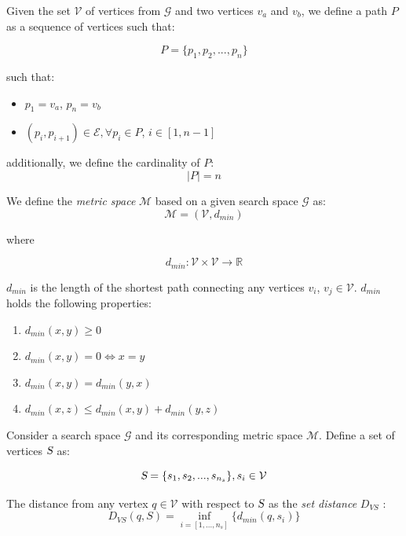 \documentclass[graybox]{svmult}
\newcommand{\Path}{\ensuremath{P} }
\newcommand{\Graph}{\ensuremath{\mathcal G} }
\newcommand{\VertexSet}{\ensuremath{\mathcal V} }
\newcommand{\EdgeSet}{\ensuremath{\mathcal E} }
\newcommand{\MetricSpace}{\ensuremath{\mathcal M} }
\newcommand{\DistanceMetric}{\ensuremath{d_{min}} }
\newcommand{\Set}{\ensuremath{\textsl S} }
\newcommand{\VertexSetDistance}{\ensuremath{D_{VS}} }
\begin{document}
\begin{definition}[Path]
Given the set \VertexSet of vertices from \Graph and two vertices $v_{a}$ and $v_{b}$, we define a path \Path as a sequence of vertices such that:

\[ \Path = \{ p_{1}, p_{2},..., p_{n} \} \]

such that:
\begin{itemize}
\item{ $p_{1} = v_{a}$, $p_{n} = v_{b}$ }
\item{ $ (p_{i}, p_{i+1}) \in \EdgeSet, \forall p_{i} \in \Path$,  $i \in [1,n-1] $}
\end{itemize}

additionally, we define the cardinality of $\Path$: 
\[ \mid \Path \mid = n \]

\end{definition}
\begin{definition}
\label{def:MetricSpace}
We define the \emph{metric space} \MetricSpace based on a given search space $\Graph$  as:
\begin{equation}
\MetricSpace = (\VertexSet, \DistanceMetric) 
\end{equation}

where 

\[ \DistanceMetric : \VertexSet \times \VertexSet \rightarrow \mathbb{R} \]

$\DistanceMetric$ is the length of the shortest path connecting any vertices $v_{i}$, $v_{j} \in \VertexSet$. $\DistanceMetric$ holds the following properties:

\begin{enumerate}
\item{$\DistanceMetric(x,y) \geq 0$ }
\item{$\DistanceMetric(x,y) = 0 \iff x = y$ }
\item{$\DistanceMetric(x,y) = \DistanceMetric(y,x)$ }
\item{$\DistanceMetric(x,z) \leq \DistanceMetric(x,y) + \DistanceMetric(y,z) $ }
\end{enumerate}
 
\end{definition}

\begin{definition}
Consider a search space \Graph and its corresponding metric space $\MetricSpace$. Define a set of vertices $\Set$ as:

\[ \Set = \{ s_{1}, s_{2},...,s_{n_{s}} \},  s_{i} \in \VertexSet \]

The distance from any vertex $q \in \VertexSet$ with respect to \Set as the \emph{set distance} $\VertexSetDistance$ :
\[ \VertexSetDistance(q, S) = \inf_{ i = [ 1,..., n_{s} ] } \{ \DistanceMetric(q, s_{i}) \} \]
\end{definition}
\end{document}
